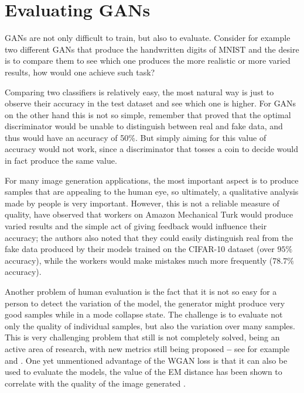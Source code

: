 \section{Evaluating GANs} \label{sec:measure_gans}
\acp{GAN} are not only difficult to train, but also to evaluate. Consider for example two different \acp{GAN} that produce the handwritten digits of \gls{MNIST} and the desire is to compare them to see which one produces the more realistic or more varied results, how would one achieve such task?

Comparing two classifiers is relatively easy, the most natural way is just to observe their accuracy in the test dataset and see which one is higher. For \acp{GAN} on the other hand this is not so simple, remember that \textcite{gans2014} proved that the optimal discriminator would be unable to distinguish between real and fake data, and thus would have an accuracy of 50\%. But simply aiming for this value of accuracy would not work, since a discriminator that tosses a coin to decide would in fact produce the same value.

For many image generation applications, the most important aspect is to produce samples that are appealing to the human eye, so ultimately, a qualitative analysis made by people is very important. However, this is not a reliable measure of quality, \textcite{improvedGANS2016} have observed that workers on Amazon Mechanical Turk would produce varied results and the simple act of giving feedback would influence their accuracy; the authors also noted that they could easily distinguish real from the fake data produced by their models trained on the \gls{CIFAR}-10 dataset (over $95\%$ accuracy), while the workers would make mistakes much more frequently ($78.7\%$ accuracy).

Another problem of human evaluation is the fact that it is not so easy for a person to detect the variation of the model, the generator might produce very good samples while in a mode collapse state. The challenge is to evaluate not only the quality of individual samples, but also the variation over many samples. This is very challenging problem that still is not completely solved, being an active area of research, with new metrics still being proposed \textbf{--} see for example \cite{new_gan_metric_1} and \cite{new_gan_metric_2}. One yet unmentioned advantage of the \gls{WGAN} loss is that it can also be used to evaluate the models, the value of the \gls{EM} distance has been shown to correlate with the quality of the image generated \cite{wasserstein2017}.

